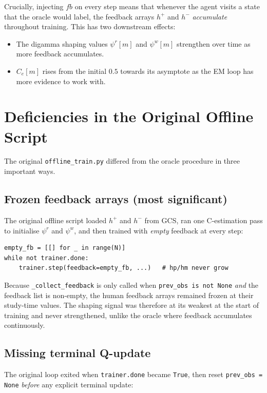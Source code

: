 \documentclass[11pt, a4paper]{article}
\begin{document}
Crucially, injecting $fb$ on every step means that whenever the agent visits a
state that the oracle would label, the feedback arrays $h^+$ and $h^-$
\emph{accumulate} throughout training.  This has two downstream effects:
\begin{itemize}
  \item The digamma shaping values $\psi^r[m]$ and $\psi^w[m]$ strengthen
        over time as more feedback accumulates.
  \item $C_e[m]$ rises from the initial $0.5$ towards its asymptote as the EM
        loop has more evidence to work with.
\end{itemize}

\section{Deficiencies in the Original Offline Script}
\label{sec:deficiencies}

The original \texttt{offline\_train.py} differed from the oracle procedure in
three important ways.

\subsection{Frozen feedback arrays (most significant)}

The original offline script loaded $h^+$ and $h^-$ from GCS, ran one
C-estimation pass to initialise $\psi^r$ and $\psi^w$, and then trained with
\emph{empty} feedback at every step:

\begin{lstlisting}
empty_fb = [[] for _ in range(N)]
while not trainer.done:
    trainer.step(feedback=empty_fb, ...)   # hp/hm never grow
\end{lstlisting}

Because \texttt{\_collect\_feedback} is only called when
\texttt{prev\_obs is not None} \emph{and} the feedback list is non-empty, the
human feedback arrays remained frozen at their study-time values.  The shaping
signal was therefore at its weakest at the start of training and never
strengthened, unlike the oracle where feedback accumulates continuously.

\subsection{Missing terminal Q-update}

The original loop exited when \texttt{trainer.done} became \texttt{True}, then
reset \texttt{prev\_obs = None} \emph{before} any explicit terminal update:
\end{document}

